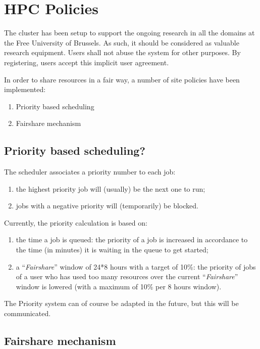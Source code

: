 \chapter{HPC Policies}
\label{ch:hpc-policies}

The cluster has been setup to support the ongoing research in all the domains
at the Free University of Brussels.  As such, it should be considered as valuable
research equipment.  Users shall not abuse the system for other purposes. By
registering, users accept this implicit user agreement.

In order to share resources in a fair way, a number of site policies have been
implemented:

\begin{enumerate}
\item  Priority based scheduling
\item  Fairshare mechanism
\end{enumerate}

\section{Priority based scheduling?}

The scheduler associates a priority number to each job:

\begin{enumerate}
\item  the highest priority job will (usually) be the next one to run;
\item  jobs with a negative priority will (temporarily) be blocked.
\end{enumerate}

Currently, the priority calculation is based on:

\begin{enumerate}
\item  the time a job is queued: the priority of a job is increased in accordance to the time (in minutes) it is waiting in the queue to get started;
\item  a ``\emph{Fairshare}'' window of 24*8 hours with a target of 10\%: the priority of jobs of a user who has used too many resources over the current ``\emph{Fairshare}'' window is lowered (with a maximum of 10\% per 8 hours window).
\end{enumerate}

The Priority system can of course be adapted in the future, but this will be communicated.

\section{Fairshare mechanism}

